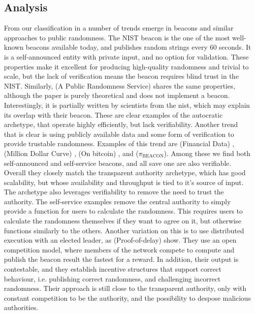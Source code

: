 \subsection{Analysis}
From our classification in  a number of trends emerge in beacons and similar approaches to public randomness. The NIST beacon \cite{nistbeacon} is the one of the most well-known beacons available today, and publishes random strings every 60 seconds. It is a self-announced entity with private input, and no option for validation. These properties make it excellent for producing high-quality randomness and trivial to scale, but the lack of verification means the beacon requires blind trust in the NIST. Similarly, \citet{fischer2011publicrandomnessservice} (A Public Randomness Service) shares the same properties, although the paper is purely theoretical and does not implement a beacon. Interestingly, it is partially written by scientists from the \gls{nist}, which may explain its overlap with their beacon. These are clear examples of the autocratic archetype, that operate highly efficiently, but lack verifiability. 
Another trend that is clear is using publicly available data and some form of verification to provide trustable randomness. Examples of this trend are \citet{clark2010use} (Financial Data) , \citet{baigneres2015trap} (Million Dollar Curve) , \citet{bonneau2015bitcoin} (On bitcoin) , and \citet{bentov2016bitcoin} ($\pi_\text{BEACON}$). Among these we find both self-announced and self-service beacons, and all save one are also verifiable. Overall they closely match the transparent authority archetype, which has good scalability, but whose availability and throughput is tied to it's source of input. The archetype also leverages verifiability to remove the need to trust the authority. The self-service examples\cite{bonneau2015bitcoin} \cite{bentov2016bitcoin}  remove the central authority to simply provide a function for users to calculate the randomness. This requires users to calculate the randomness themselves if they want to agree on it, but otherwise functions similarly to the others. Another variation on this is to use distributed execution with an elected leader, as \citet{bunz2017proofsof} (Proof-of-delay) show. They use an open competition model, where members of the network compete to compute and publish the beacon result the fastest for a reward. In addition, their output is contestable, and they establish incentive structures that support correct behaviour, i.e. publishing correct randomness, and challenging incorrect randomness. Their approach is still close to the transparent authority, only with constant competition to be the authority, and the possibility to despose malicious authorities. 
